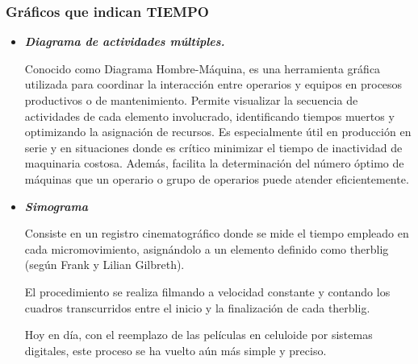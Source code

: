 \documentclass[a4paper,oneside,11pt]{article}
\begin{document}
\subsubsection{Gráficos que indican TIEMPO}
\begin{itemize}
    \item \textbf{\textit{Diagrama de actividades múltiples.}}
    
        Conocido como Diagrama Hombre-Máquina, es una herramienta gráfica utilizada para coordinar la interacción entre operarios y equipos en procesos productivos o de mantenimiento. Permite visualizar la secuencia de actividades de cada elemento involucrado, identificando tiempos muertos y optimizando la asignación de recursos. Es especialmente útil en producción en serie y en situaciones donde es crítico minimizar el tiempo de inactividad de maquinaria costosa. Además, facilita la determinación del número óptimo de máquinas que un operario o grupo de operarios puede atender eficientemente.
    \item \textbf{\textit{Simograma}}

    Consiste en un registro cinematográfico donde se mide el tiempo empleado en cada micromovimiento, asignándolo a un elemento definido como therblig (según Frank y Lilian Gilbreth).

    El procedimiento se realiza filmando a velocidad constante y contando los cuadros transcurridos entre el inicio y la finalización de cada therblig.
    
    Hoy en día, con el reemplazo de las películas en celuloide por sistemas digitales, este proceso se ha vuelto aún más simple y preciso.
\end{itemize}
\end{document}
